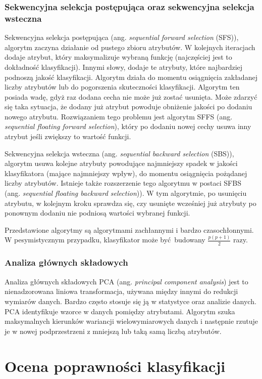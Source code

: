 \subsubsection{Sekwencyjna selekcja postępująca oraz sekwencyjna selekcja wsteczna}
Sekwencyjna selekcja postępująca (ang. \textit{sequential forward selection} (SFS)), algorytm zaczyna działanie od pustego zbioru atrybutów. W kolejnych iteracjach dodaje atrybut, który maksymalizuje wybraną funkcję (najczęściej jest to dokładność klasyfikacji). Innymi słowy, dodaje te atrybuty, które najbardziej podnoszą jakość klasyfikacji. Algorytm działa do momentu osiągnięcia zakładanej liczby atrybutów lub do pogorszenia skuteczności klasyfikacji. Algorytm ten posiada wadę, gdyż raz dodana cecha nie może już zostać usunięta. Może zdarzyć się taka sytuacja, że dodany już atrybut powoduje obniżenie jakości po dodaniu nowego atrybutu. Rozwiązaniem tego problemu jest algorytm SFFS (ang. \textit{sequential floating forward selection}), który po dodaniu nowej cechy usuwa inny atrybut jeśli zwiększy to wartość funkcji. \par
Sekwencyjna selekcja wsteczna (ang. \textit{sequential backward selection} (SBS)), algorytm usuwa kolejne atrybuty powodujące najmniejszy spadek w jakości klasyfikatora (mające najmniejszy wpływ), do momentu osiągnięcia pożądanej liczby atrybutów. Istnieje także rozszerzenie tego algorytmu w postaci SFBS (ang. \textit{sequential floating backward selection})). W tym algorytmie, po usunięciu atrybutu, w kolejnym kroku sprawdza się, czy usunięte wcześniej już atrybuty po ponownym dodaniu nie podniosą wartości wybranej funkcji. \par
Przedstawione algorytmy są algorytmami zachłannymi i bardzo czasochłonnymi. W pesymistycznym przypadku, klasyfikator może być budowany $\frac{p(p+1)}{2}$ razy.
\subsubsection{Analiza głównych składowych}
Analiza głównych składowych PCA (ang. \textit{principal component analysis}) jest to nienadzorowana liniowa transformacja, używana między innymi do redukcji wymiarów danych. Bardzo często stosuje się ją w statystyce oraz analizie danych. PCA identyfikuje wzorce w danych pomiędzy atrybutami. Algorytm szuka maksymalnych kierunków wariancji wielowymiarowych danych i następnie rzutuje je w nowej podprzestrzeni z mniejszą lub taką samą liczbą atrybutów. 

\section{Ocena poprawności klasyfikacji}
